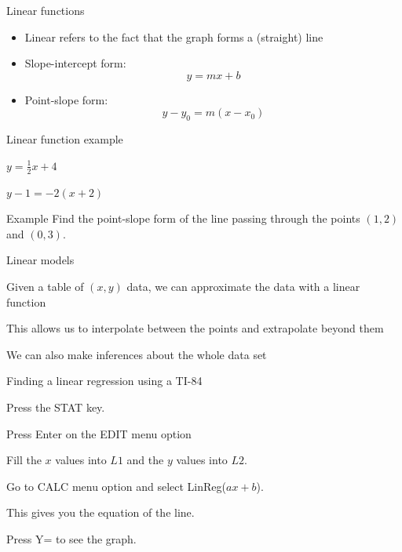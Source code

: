 \documentclass[t]{beamer}
\newenvironment{fpi}
  {\itemize[nolistsep,itemsep=\fill]}
  {\vfill\enditemize}
\begin{document}
\begin{frame}{Linear functions}
\begin{itemize}
\item Linear refers to the fact that the graph forms a (straight) line
\vfill
\item Slope-intercept form:
$$y = mx + b$$
\vfill
\item Point-slope form:
$$y - y_0 = m(x - x_0)$$
\vfill
\end{itemize}
\end{frame}

\begin{frame}{Linear function example}
\begin{fpi}
\item $\displaystyle y = \frac{1}{2}x + 4$
\item $\displaystyle y - 1 = -2(x  +2)$
\end{fpi}
\end{frame}


\begin{frame}{Example}
Find the point-slope form of the line passing through the points
$(1,2)$ and $(0,3)$.
\end{frame}

\begin{frame}{Linear models}
\begin{fpi}
\item Given a table of $(x,y)$ data, we can approximate the data
with a linear function
\item This allows us to interpolate between the points and extrapolate beyond them
\item We can also make inferences about the whole data set
\end{fpi}
\end{frame}

\begin{frame}{Finding a linear regression using a TI-84}
\begin{fpi}
\item Press the STAT key.
\item Press Enter on the EDIT menu option
\item Fill the $x$ values into $L1$ and the $y$ values into $L2$.
\item Go to CALC menu option and select LinReg($ax + b$).
\item This gives you the equation of the line.
\item Press Y= to see the graph.
\end{fpi}
\end{frame}
\end{document}
